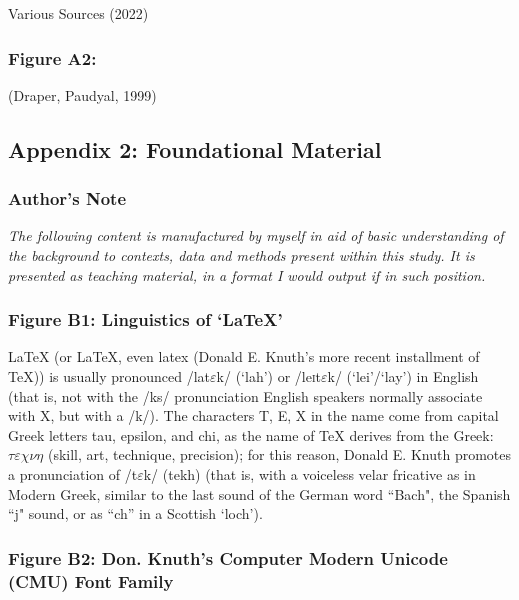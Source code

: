 \documentclass[11pt, english]{article}
\begin{document}
		Various Sources (2022)

		\subsubsection*{Figure A2:}

			\begin{center}
                        \end{center}

			(Draper, Paudyal, 1999)


	\subsection*{Appendix 2: Foundational Material}

		\subsubsection*{Author's Note}

			\textit{The following content is manufactured by myself in aid of basic understanding of the background to contexts, data and methods present within this study. It is presented as teaching material, in a format I would output if in such position.}
		\subsubsection*{Figure B1: Linguistics of `{\LaTeX}'}

		{\LaTeX} (or LaTeX, even latex (Donald E. Knuth's more recent installment of {\TeX})) is usually pronounced /la\textlengthmark t$\varepsilon$k/ (`lah') or /le\textsc{i}t$\varepsilon$k/ (`lei'/`lay') in English (that is, not with the /ks/ pronunciation English speakers normally associate with X, but with a /k/). The characters T, E, X in the name come from capital Greek letters tau, epsilon, and chi, as the name of {\TeX} derives from the Greek: $\tau\varepsilon\chi\nu\eta$ (skill, art, technique, precision); for this reason, Donald E. Knuth promotes a pronunciation of /t$\varepsilon$k/ (tekh) (that is, with a voiceless velar fricative as in Modern Greek, similar to the last sound of the German word ``Bach", the Spanish ``j" sound, or as ``ch'' in a Scottish `loch'). 

		\subsubsection*{Figure B2: Don. Knuth's Computer Modern Unicode (CMU) Font Family}
\end{document}
